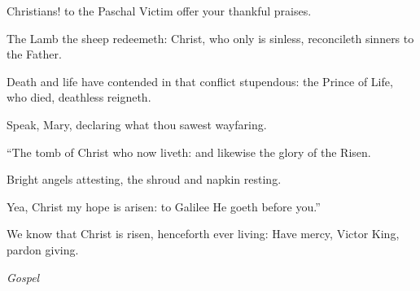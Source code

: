 \documentclass[11pt]{article} %
\begin{document}
\def\greinitialformat#1{%
{\fontsize{34}{34}\selectfont #1}%
}




Christians! to the Paschal Victim offer your thankful praises.

The Lamb the sheep redeemeth: Christ, who only is sinless, reconcileth sinners to the Father.

Death and life have contended in that conflict stupendous: the Prince of Life, who died, deathless reigneth.

Speak, Mary, declaring what thou sawest wayfaring.

``The tomb of Christ who now liveth: and likewise the glory of the Risen.

Bright angels attesting, the shroud and napkin resting.

Yea, Christ my hope is arisen: to Galilee He goeth before you.''

We know that Christ is risen, henceforth ever living: Have mercy, Victor King, pardon giving.

\vskip10pt
\emph{Gospel}
\vskip20pt

\def\greinitialformat#1{%
{\fontsize{34}{34}\selectfont #1}%
}




\vskip20pt
\end{document}
